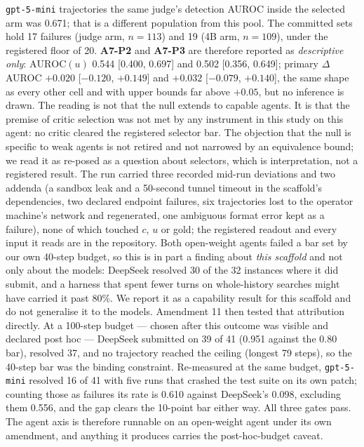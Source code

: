 \documentclass[11pt]{article}
\begin{document}
\begin{itemize}[leftmargin=1.2em,itemsep=1pt]
\texttt{gpt-5-mini} trajectories the same judge's detection AUROC inside the selected arm was 0.671; that is a different population from this pool. The committed sets hold 17 failures (judge arm, $n=113$) and 19 (4B arm, $n=109$), under the registered floor of 20. \textbf{A7-P2} and \textbf{A7-P3} are therefore reported as \emph{descriptive only}: $\mathrm{AUROC}(u)$ 0.544 [0.400, 0.697] and 0.502 [0.356, 0.649]; primary $\Delta$AUROC $+0.020$ [$-0.120$, $+0.149$] and $+0.032$ [$-0.079$, $+0.140$], the same shape as every other cell and with upper bounds far above $+0.05$, but no inference is drawn. The reading is not that the null extends to capable agents. It is that the premise of critic selection was not met by any instrument in this study on this agent: no critic cleared the registered selector bar. The objection that the null is specific to weak agents is not retired and not narrowed by an equivalence bound; we read it as re-posed as a question about selectors, which is interpretation, not a registered result. The run carried three recorded mid-run deviations and two addenda (a sandbox leak and a 50-second tunnel timeout in the scaffold's dependencies, two declared endpoint failures, six trajectories lost to the operator machine's network and regenerated, one ambiguous format error kept as a failure), none of which touched $c$, $u$ or gold; the registered readout and every input it reads are in the repository. Both open-weight agents failed a bar set by our own 40-step budget, so this is in part a finding about \emph{this scaffold} and not only about the models: DeepSeek resolved 30 of the 32 instances where it did submit, and a harness that spent fewer turns on whole-history searches might have carried it past 80\%. We report it as a capability result for this scaffold and do not generalise it to the models. Amendment 11 then tested that attribution directly. At a 100-step budget --- chosen after this outcome was visible and declared post hoc --- DeepSeek submitted on 39 of 41 (0.951 against the 0.80 bar), resolved 37, and no trajectory reached the ceiling (longest 79 steps), so the 40-step bar was the binding constraint. Re-measured at the same budget, \texttt{gpt-5-mini} resolved 16 of 41 with five runs that crashed the test suite on its own patch; counting those as failures its rate is 0.610 against DeepSeek's 0.098, excluding them 0.556, and the gap clears the 10-point bar either way. All three gates pass. The agent axis is therefore runnable on an open-weight agent under its own amendment, and anything it produces carries the post-hoc-budget caveat.


\end{itemize}
\end{document}
